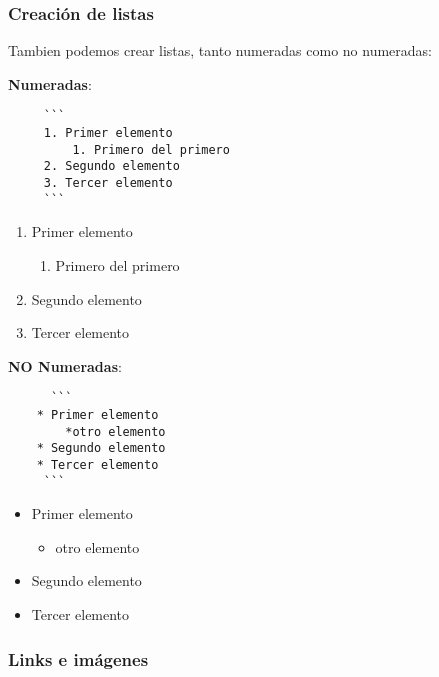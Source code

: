 \documentclass[11pt]{article}
\providecommand{\tightlist}{%
      \setlength{\itemsep}{0pt}\setlength{\parskip}{0pt}}
\begin{document}
    \hypertarget{creaciuxf3n-de-listas}{%
\subsubsection{Creación de listas}\label{creaciuxf3n-de-listas}}

Tambien podemos crear listas, tanto numeradas como no numeradas:

\textbf{Numeradas}:

\begin{verbatim}
     ``` 
     1. Primer elemento
         1. Primero del primero
     2. Segundo elemento
     3. Tercer elemento
     ```
\end{verbatim}

\begin{enumerate}
\def\labelenumi{\arabic{enumi}.}
\tightlist
\item
  Primer elemento

  \begin{enumerate}
  \def\labelenumii{\arabic{enumii}.}
  \tightlist
  \item
    Primero del primero
  \end{enumerate}
\item
  Segundo elemento
\item
  Tercer elemento
\end{enumerate}

\textbf{NO Numeradas}:

\begin{verbatim}
      ``` 
    * Primer elemento
        *otro elemento
    * Segundo elemento
    * Tercer elemento
     ```
\end{verbatim}

\begin{itemize}
\tightlist
\item
  Primer elemento

  \begin{itemize}
  \tightlist
  \item
    otro elemento
  \end{itemize}
\item
  Segundo elemento
\item
  Tercer elemento
\end{itemize}

    \hypertarget{links-e-imuxe1genes}{%
\subsubsection{Links e imágenes}\label{links-e-imuxe1genes}}
\end{document}
